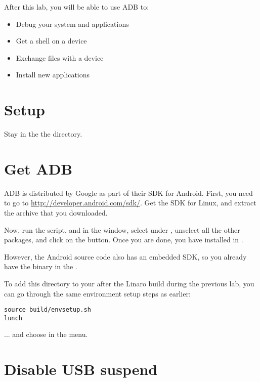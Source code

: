 
After this lab, you will be able to use ADB to:
\begin{itemize}
  \item Debug your system and applications
  \item Get a shell on a device
  \item Exchange files with a device
  \item Install new applications
\end{itemize}

\section{Setup}

Stay in the the  directory.

\section{Get ADB}

ADB is distributed by Google as part of their SDK for Android. First,
you need to go to
\url{http://developer.android.com/sdk/}. Get the SDK for
Linux, and extract the archive that you downloaded.

Now, run the  script, and in the 
window, select  under ,
unselect all the other packages, and click on the  button.
Once you are done, you have  installed in .

However, the Android source code also has an embedded SDK, so you
already have the  binary in the .

To add this directory to your  after the Linaro build 
during the previous lab, you can go through the same environment setup steps
as earlier:

\begin{verbatim}
source build/envsetup.sh
lunch
\end{verbatim}

... and choose  in the  menu.

\section{Disable USB suspend}

